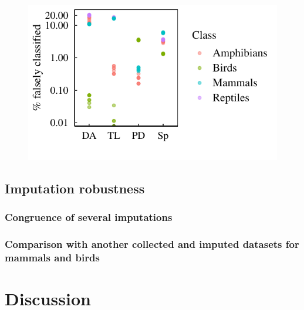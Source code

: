 \begin{figure}[h!]
\centering
\includegraphics[scale=0.75]{figures/chapter2/Imputation_errors/PFC}
\caption[]{}
\label{plotPFC}
\end{figure}


\subsection{Imputation robustness}

\subsubsection{Congruence of several imputations}

\subsubsection{Comparison with another collected and imputed datasets for mammals and birds}

\pagebreak
\section{Discussion}


